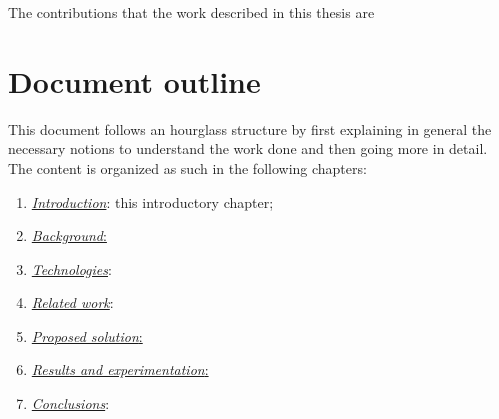 		The contributions that the work described in this thesis are
		
	
	\section{Document outline}\label{sec:document_outline}
		
		This document follows an hourglass structure by first explaining in general the necessary notions to understand the work done and then going more in detail.
		The content is organized as such in the following chapters:
		\begin{enumerate}
			\item \hyperref[chapter:introduction]{\textit{Introduction}}: this introductory chapter;
			\item \hyperref[chapter:background]{\textit{Background}:}
			\item \hyperref[chapter:technologies]{\textit{Technologies}}:
			\item \hyperref[chapter:related_work]{\textit{Related work}}:
			\item \hyperref[chapter:proposed_solution]{\textit{Proposed solution}:}
			\item \hyperref[chapter:results]{\textit{Results and experimentation}:}
			\item \hyperref[chapter:conclusions]{\textit{Conclusions}}:
			
		\end{enumerate}
